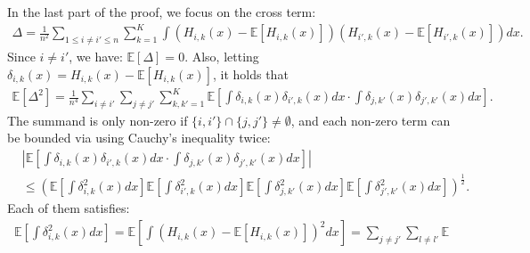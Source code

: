 \documentclass[preprint,11pt]{article}
\newcommand{\mbb}{\mathbb}
\numberwithin{equation}{section}
\begin{document}
In the last part of the proof, we focus on the cross term:
\begin{align*}
    \Delta=\frac{1}{n^2}\sum_{1\le i\neq i'\le n}\sum_{k=1}^K\int (H_{i,k}(x)-\mbb{E}[H_{i,k}(x)])(H_{i',k}(x)-\mbb{E}[H_{i',k}(x)])dx.
\end{align*}
Since $i\neq i'$, we have: $\mbb{E}[\Delta]=0$. Also, letting $\delta_{i,k}(x)=H_{i,k}(x)-\mbb{E}[H_{i,k}(x)]$, it holds that
\begin{align*}
    \mbb{E}[\Delta^2]=\frac{1}{n^4}\sum_{i\neq i'}\sum_{j\neq j'}\sum_{k,k'=1}^K \mbb{E}\left[ \int\delta_{i,k}(x)\delta_{i',k}(x)dx\cdot\int \delta_{j,k'}(x)\delta_{j',k'}(x)dx\right].
\end{align*}
The summand is only non-zero if $\{i,i'\}\cap\{j,j'\}\neq \emptyset$, and each non-zero term can be bounded via using Cauchy's inequality twice:
\begin{align*}
    &\left|\mbb{E}\left[ \int\delta_{i,k}(x)\delta_{i',k}(x)dx\cdot\int \delta_{j,k'}(x)\delta_{j',k'}(x)dx\right]\right|\\
    &\le \left(\mbb{E}\left[\int \delta^2_{i,k}(x)dx\right]\mbb{E}\left[\int \delta^2_{i',k}(x)dx\right]\mbb{E}\left[\int \delta^2_{j,k'}(x)dx\right]\mbb{E}\left[\int \delta^2_{j',k'}(x)dx\right]\right)^{\frac{1}{2}}.
\end{align*}
Each of them satisfies:
\begin{align*}
    \mbb{E}\left[\int \delta^2_{i,k}(x)dx\right]= \mbb{E}\left[\int (H_{i,k}(x)-\mbb{E}[H_{i,k}(x)])^2dx\right]=\sum_{j\neq j'}\sum_{l\neq l'}\mbb{E}
\end{align*}
\fi
\end{document}
